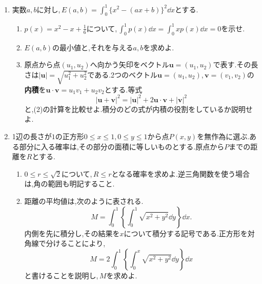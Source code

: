 \begin{enumerate}[label=\textbf{\thechapter.\arabic*},leftmargin=*,itemsep=6pt,start=19]
正の整数$m$と非負整数$n$について
\[
 S_{m,n}=\sum_{k=0}^n\frac{(-1)^k\binom nk}{m+k}
\]
とする.
\begin{enumerate}[label=(\arabic*),leftmargin=*]
\item $S_{m,n}$を1つの定積分で表し,階乗を用いて値を求めよ.
\item $m$を固定するとき,\,$\lim_{n\to\infty}n^m S_{m,n}$を求めよ.
\end{enumerate}
\item\label{問:融合近似とベクトル}
実数$a,b$に対し,\,$E(a,b)=\int_0^1\{x^2-(ax+b)\}^2\dd x$とする.
\begin{enumerate}[label=(\arabic*),leftmargin=*]
\item $p(x)=x^2-x+\frac16$について,\,$\int_0^1p(x)\dd x=\int_0^1xp(x)\dd x=0$を示せ.
\item $E(a,b)$の最小値と,それを与える$a,b$を求めよ.
\item 原点から点$(u_1,u_2)$へ向かう矢印をベクトル$\boldsymbol u=(u_1,u_2)$で表す.その長さは$|\boldsymbol u|=\sqrt{u_1^2+u_2^2}$である.2つのベクトル$\boldsymbol u=(u_1,u_2)$,\,$\boldsymbol v=(v_1,v_2)$の\textbf{内積}を$\boldsymbol u\cdot\boldsymbol v=u_1v_1+u_2v_2$とする.等式
\[
 |\boldsymbol u+\boldsymbol v|^2=|\boldsymbol u|^2+2\boldsymbol u\cdot\boldsymbol v+|\boldsymbol v|^2
\]
と,(2)の計算を比較せよ.積分のどの式が内積の役割をしているか説明せよ.
\end{enumerate}
\item\label{問:融合確率と距離}
1辺の長さが$1$の正方形$0\le x\le1,0\le y\le1$から点$P(x,y)$を無作為に選ぶ.ある部分に入る確率は,その部分の面積に等しいものとする.原点から$P$までの距離を$R$とする.
\begin{enumerate}[label=(\arabic*),leftmargin=*]
\item $0\le r\le\sqrt2$について,\,$R\le r$となる確率を求めよ.逆三角関数を使う場合は,角の範囲も明記すること.
\item 距離の平均値は,次のように表される.
\[
 M=\int_0^1\left\{\int_0^1\sqrt{x^2+y^2}\dd y\right\}\dd x.
\]
内側を先に積分し,その結果を$x$について積分する記号である.正方形を対角線で分けることにより,
\[
 M=2\int_0^1\left\{\int_0^x\sqrt{x^2+y^2}\dd y\right\}\dd x
\]
と書けることを説明し,\,$M$を求めよ.
\end{enumerate}
\end{enumerate}
